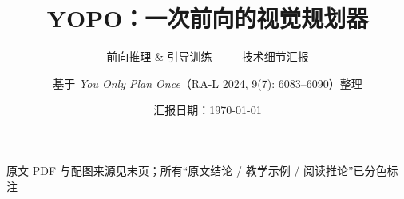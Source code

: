 \documentclass[aspectratio=169,11pt]{beamer}
\title[YOPO 技术汇报]{YOPO：一次前向的视觉规划器}
\subtitle{前向推理 \& 引导训练 —— 技术细节汇报}
\author{基于 \emph{You Only Plan Once}（RA-L 2024, 9(7): 6083--6090）整理}
\institute{笔记依据：\texttt{YOPO/papernote.md}（2026-10-08 版）}
\date{汇报日期：\today}
\begin{document}
\begin{frame}[plain]
  \titlepage
  \begin{center}
    \small\color{yopogray}
    原文 PDF 与配图来源见末页；所有“原文结论 / 教学示例 / 阅读推论”已分色标注
  \end{center}
\end{frame}






\end{document}
